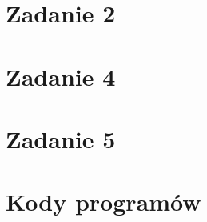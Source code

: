





 



\section*{Zadanie 2}


\section*{Zadanie 4}


\section*{Zadanie 5}



\newpage \section*{Kody programów}











